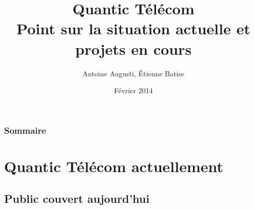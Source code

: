 \documentclass[handout]{beamer}
\title[Quantic]{
	Quantic Télécom\\
	Point sur la situation actuelle et projets en cours
}
\author{
	Antoine Augusti, 
	Étienne Batise
}
\date{Février 2014}
\begin{document}
	
	\begin{frame}[plain]
		\titlepage
	\end{frame}

	\begin{frame}[plain]
		\frametitle{Sommaire}
		\tableofcontents
	\end{frame}


	\section{Quantic Télécom actuellement}

	\subsection{Public couvert aujourd'hui}
\end{document}

